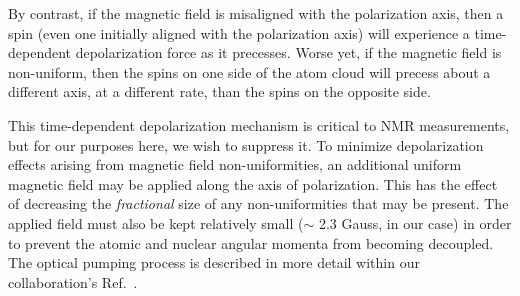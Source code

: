 By contrast, if the magnetic field is misaligned with the polarization axis, then a spin (even one initially aligned with the polarization axis) will experience a time-dependent depolarization force as it precesses.  Worse yet, if the magnetic field is non-uniform, then the spins on one side of the atom cloud will precess about a different axis, at a different rate, than the spins on the opposite side.  

This time-dependent depolarization mechanism is critical to \ac{NMR} measurements, but for our purposes here, we wish to suppress it.  To minimize depolarization effects arising from magnetic field non-uniformities, an additional uniform magnetic field may be applied along the axis of polarization.  This has the effect of decreasing the \emph{fractional} size of any non-uniformities that may be present.  The applied field must also be kept relatively small ($\sim$ 2.3 Gauss, in our case) in order to prevent the atomic and nuclear angular momenta from becoming decoupled.  The optical pumping process is described in more detail within our collaboration's Ref.~\cite{ben_OP}.




%




